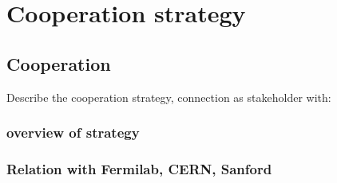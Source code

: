 \documentclass[../main-v1.tex]{subfiles}
\begin{document}
\chapter{Cooperation strategy }
\label{ch:coop}

\section{Cooperation}
Describe the cooperation strategy, connection as stakeholder with:
\subsection{overview of strategy}

\subsection{Relation with Fermilab, CERN, Sanford }





\end{document}
